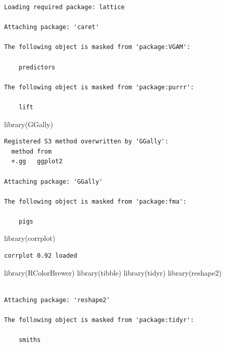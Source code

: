 \documentclass[
  letterpaper,
  DIV=11,
  numbers=noendperiod]{scrartcl}
\newenvironment{Shaded}{\begin{snugshade}}{\end{snugshade}}
\newcommand{\FunctionTok}[1]{\textcolor[rgb]{0.28,0.35,0.67}{#1}}
\newcommand{\NormalTok}[1]{\textcolor[rgb]{0.00,0.23,0.31}{#1}}
\begin{document}
\begin{verbatim}
Loading required package: lattice

Attaching package: 'caret'

The following object is masked from 'package:VGAM':

    predictors

The following object is masked from 'package:purrr':

    lift
\end{verbatim}

\begin{Shaded}
\begin{Highlighting}[]
\FunctionTok{library}\NormalTok{(GGally)}
\end{Highlighting}
\end{Shaded}

\begin{verbatim}
Registered S3 method overwritten by 'GGally':
  method from   
  +.gg   ggplot2

Attaching package: 'GGally'

The following object is masked from 'package:fma':

    pigs
\end{verbatim}

\begin{Shaded}
\begin{Highlighting}[]
\FunctionTok{library}\NormalTok{(corrplot)}
\end{Highlighting}
\end{Shaded}

\begin{verbatim}
corrplot 0.92 loaded
\end{verbatim}

\begin{Shaded}
\begin{Highlighting}[]
\FunctionTok{library}\NormalTok{(RColorBrewer)}
\FunctionTok{library}\NormalTok{(tibble)}
\FunctionTok{library}\NormalTok{(tidyr)}
\FunctionTok{library}\NormalTok{(reshape2)}
\end{Highlighting}
\end{Shaded}

\begin{verbatim}

Attaching package: 'reshape2'

The following object is masked from 'package:tidyr':

    smiths
\end{verbatim}
\end{document}
